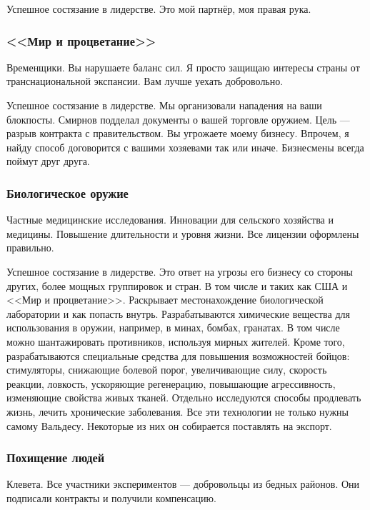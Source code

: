 \documentclass{article}
\begin{document}
Успешное состязание в лидерстве. Это мой партнёр, моя правая рука.

\subsubsection{<<Мир и
процветание>>}\label{pap-valdes}

Временщики. Вы нарушаете баланс сил. Я просто защищаю интересы страны от
транснациональной экспансии. Вам лучше уехать добровольно.

Успешное состязание в лидерстве. Мы организовали нападения на ваши
блокпосты. Смирнов подделал документы о вашей торговле оружием. Цель ---
разрыв контракта с правительством. Вы угрожаете моему бизнесу. Впрочем,
я найду способ договорится с вашими хозяевами так или иначе. Бизнесмены
всегда поймут друг друга.

\subsubsection{Биологическое
оружие}\label{biological-weapons}

Частные медицинские исследования. Инновации для сельского хозяйства и
медицины. Повышение длительности и уровня жизни. Все лицензии оформлены
правильно.

Успешное состязание в лидерстве. Это ответ на угрозы его бизнесу со
стороны других, более мощных группировок и стран. В том числе и таких
как США и <<Мир и процветание>>. Раскрывает местонахождение биологической
лаборатории и как попасть внутрь. Разрабатываются химические вещества
для использования в оружии, например, в минах, бомбах, гранатах. В том
числе можно шантажировать противников, используя мирных жителей. Кроме
того, разрабатываются специальные средства для повышения возможностей
бойцов: стимуляторы, снижающие болевой порог, увеличивающие силу,
скорость реакции, ловкость, ускоряющие регенерацию, повышающие
агрессивность, изменяющие свойства живых тканей. Отдельно исследуются
способы продлевать жизнь, лечить хронические заболевания. Все эти
технологии не только нужны самому Вальдесу. Некоторые из них он
собирается поставлять на экспорт.

\subsubsection{Похищение
людей}\label{kidnapping-valdes}

Клевета. Все участники экспериментов --- добровольцы из бедных районов.
Они подписали контракты и получили компенсацию.
\end{document}
